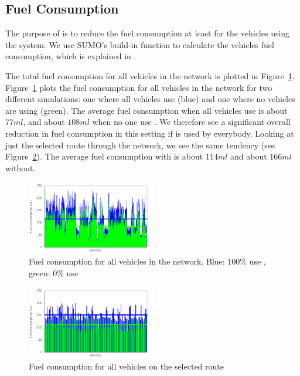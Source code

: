 \subsection{Fuel Consumption}
The purpose of \tech is to reduce the fuel consumption at least for the vehicles using the system. 
We use SUMO's build-in function to calculate the vehicles fuel consumption, which is explained in \cite{SUMOFuel}.

The total fuel consumption for all vehicles in the network is plotted in Figure~\ref{fig:TestResults:fuelTotal}.
Figure~\ref{fig:TestResults:fuelTotal} plots the fuel consumption for all vehicles in the network for two different simulations: one where all vehicles use \tech (blue) and one where no vehicles are using \tech (green).
The average fuel consumption when all vehicles use \tech is about $77 ml$, and about $108 ml$ when no one use \tech.
We therefore see a significant overall reduction in fuel consumption in this setting if \tech is used by everybody.
Looking at just the selected route through the network, we see the same tendency (see Figure~\ref{fig:TestResults:fuelRoute}). 
The average fuel consumption with \tech is about $114 ml$ and about $166 ml$ without. 
\begin{figure}[h]
\includegraphics[width=0.5\textwidth]{../images/tp0/fuelTotal.png}
\caption{Fuel consumption for all vehicles in the network. Blue: 100\% use \tech, green: 0\% use \tech}
\label{fig:TestResults:fuelTotal}
\end{figure}
\begin{figure}[h]
\includegraphics[width=0.5\textwidth]{../images/tp0/fuelRoute.png}
\caption{Fuel consumption for all vehicles on the selected route}
\label{fig:TestResults:fuelRoute}
\end{figure}

